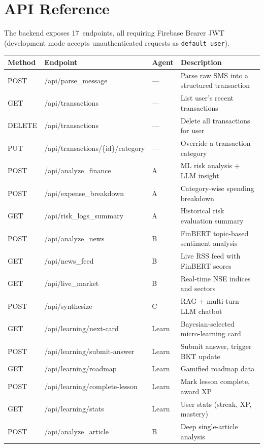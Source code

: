 \documentclass[12pt,a4paper]{article}
\begin{document}
\newpage
\section{API Reference}

The backend exposes 17~endpoints, all requiring Firebase Bearer JWT (development mode accepts unauthenticated requests as \texttt{default\_user}).

\begin{table}[h!]
\centering
\renewcommand{\arraystretch}{1.15}
\small
\begin{tabularx}{\textwidth}{l l l X}
\toprule
\textbf{Method} & \textbf{Endpoint} & \textbf{Agent} & \textbf{Description} \\
\midrule
POST   & /api/parse\_message               & ---   & Parse raw SMS into a structured transaction \\
GET    & /api/transactions                 & ---   & List user's recent transactions \\
DELETE & /api/transactions                 & ---   & Delete all transactions for user \\
PUT    & /api/transactions/\{id\}/category & ---   & Override a transaction category \\
POST   & /api/analyze\_finance             & A     & ML risk analysis + LLM insight \\
POST   & /api/expense\_breakdown           & A     & Category-wise spending breakdown \\
GET    & /api/risk\_logs\_summary           & A     & Historical risk evaluation summary \\
POST   & /api/analyze\_news                & B     & FinBERT topic-based sentiment analysis \\
GET    & /api/news\_feed                   & B     & Live RSS feed with FinBERT scores \\
GET    & /api/live\_market                 & B     & Real-time NSE indices and sectors \\
POST   & /api/synthesize                   & C     & RAG + multi-turn LLM chatbot \\
GET    & /api/learning/next-card           & Learn & Bayesian-selected micro-learning card \\
POST   & /api/learning/submit-answer       & Learn & Submit answer, trigger BKT update \\
GET    & /api/learning/roadmap             & Learn & Gamified roadmap data \\
POST   & /api/learning/complete-lesson     & Learn & Mark lesson complete, award XP \\
GET    & /api/learning/stats               & Learn & User stats (streak, XP, mastery) \\
POST   & /api/analyze\_article             & B     & Deep single-article analysis \\
\bottomrule
\end{tabularx}
\end{table}
\end{document}
